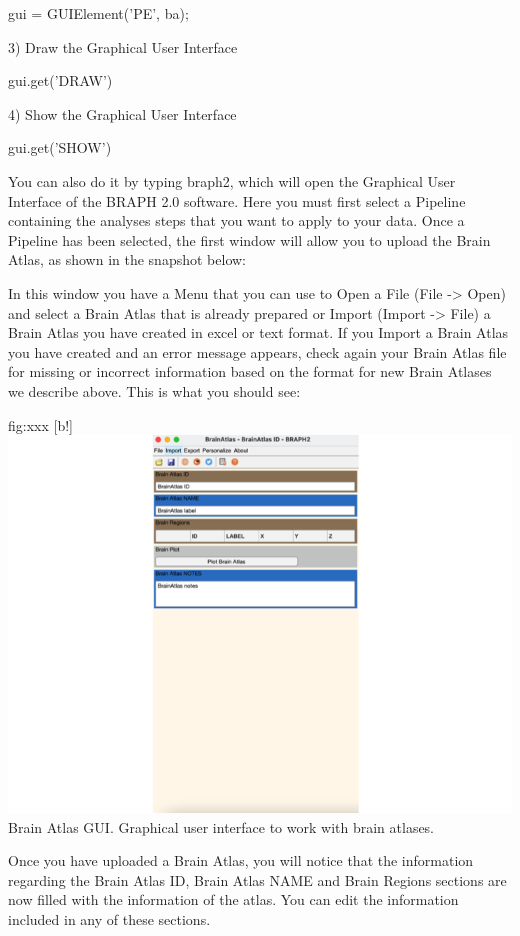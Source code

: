 \documentclass{tufte-handout}
\begin{document}
gui = GUIElement('PE', ba);


3) Draw the Graphical User Interface

gui.get('DRAW')


4) Show  the Graphical User Interface

gui.get('SHOW')


You can also do it by typing braph2, which will open the Graphical User Interface of the BRAPH 2.0 software. Here you must first select a Pipeline containing the analyses steps that you want to apply to your data. Once a Pipeline has been selected, the first window will allow you to upload the Brain Atlas, as shown in the snapshot below:

 
In this window you have a Menu that you can use to Open a File (File -> Open) and select a Brain Atlas that is already prepared or Import (Import -> File) a Brain Atlas you have created in excel or text format. If you Import a Brain Atlas you have created and an error message appears, check again your Brain Atlas file for missing or incorrect information based on the format for new Brain Atlases we describe above. This is what you should see:

	{fig:xxx}
	{
	[b!]
	\includegraphics{tut_ba/fig7.png}
	}
	{Brain Atlas GUI.}
	{
	Graphical user interface to work with brain atlases. 
	}

Once you have uploaded a Brain Atlas, you will notice that the information regarding the Brain Atlas ID, Brain Atlas NAME and Brain Regions sections are now filled with the information of the atlas. You can edit the information included in any of these sections. 
\end{document}
